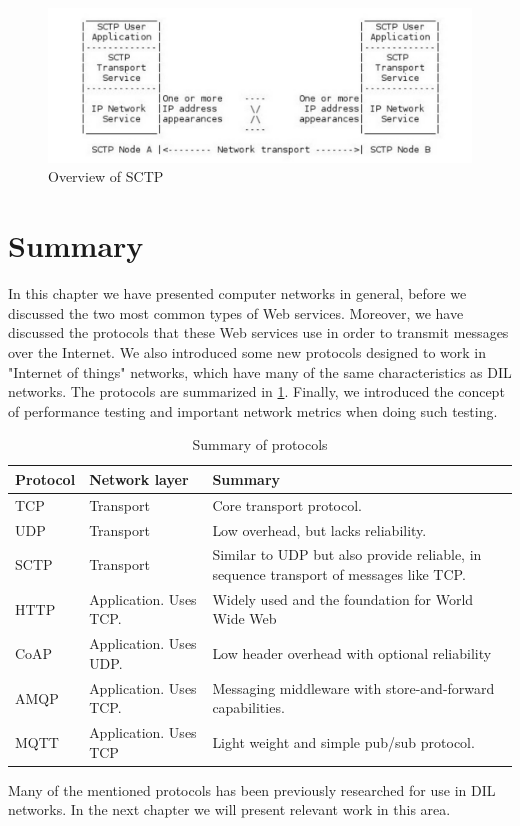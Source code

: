 \begin{figure}[h]
\includegraphics[scale=0.5]{images/sctp.pdf}
\caption{Overview of SCTP}
\end{figure}



\section{Summary}

In this chapter we have presented computer networks in general, before we
discussed the two most common types of Web services. Moreover, we have discussed
the protocols that these Web services use in order to transmit messages over the
Internet. We also introduced some new protocols designed to work in "Internet of
things" networks, which have many of the same characteristics as DIL networks.
The protocols are summarized in \cref{table:protocols:summary}. Finally, we
introduced the concept of performance testing and important network metrics when
doing such testing.

\begin{table}[h]
\begin{tabularx}{\textwidth}{| l | l | X |}
\hline
  \textbf{Protocol} & \textbf{Network layer} & \textbf{Summary} \\ \hline
  TCP & Transport & Core transport protocol. \\ \hline
  UDP & Transport & Low overhead, but lacks reliability. \\ \hline
  SCTP & Transport & Similar to UDP but also provide reliable, in sequence transport of messages like TCP. \\ \hline
  HTTP & Application. Uses TCP. &  Widely used and the foundation for World Wide Web\\ \hline
  CoAP & Application. Uses UDP. & Low header overhead with optional reliability \\ \hline
  AMQP & Application. Uses TCP. &  Messaging middleware with store-and-forward capabilities.\\ \hline
  MQTT & Application. Uses TCP & Light weight and simple pub/sub protocol. \\ \hline
\end{tabularx}
\caption{Summary of protocols}
\label{table:protocols:summary}
\end{table}

Many of the mentioned protocols has been previously researched for use in DIL
networks. In the next chapter we will present relevant work in this area.
